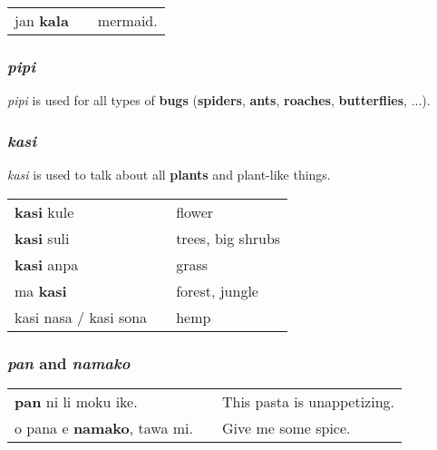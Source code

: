\begin{supertabular}{p{5,5cm}|ll}
jan \textbf{kala} && mermaid. \\
\end{supertabular} 
%
\subsubsection*{\textit{pipi}}
%
\textit{pipi} is used for all types of \textbf{bugs} (\textbf{spiders}, \textbf{ants}, \textbf{roaches}, \textbf{butterflies}, ...). 
%
\newpage
{}
\subsubsection*{\textit{kasi}}
%
\textit{kasi} is used to talk about all \textbf{plants} and plant-like things. 

\begin{supertabular}{p{5,5cm}|ll}
\textbf{kasi} kule && flower \\
\textbf{kasi} suli && trees, big shrubs \\
\textbf{kasi} anpa && grass \\
ma \textbf{kasi} && forest, jungle \\
kasi nasa / kasi sona && hemp  \\
\end{supertabular} 
%
\subsubsection*{\textit{pan} and \textit{namako}}
\begin{supertabular}{p{5,5cm}|ll}
\textbf{pan} ni li moku ike. && This pasta is unappetizing. \\
o pana e \textbf{namako}, tawa mi. &&   Give me some spice. \\
\end{supertabular} 
%
